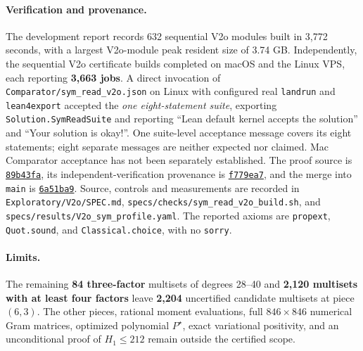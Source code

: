 \documentclass[11pt]{article}
\newcommand{\code}[1]{\texttt{#1}}
\begin{document}
\paragraph{Verification and provenance.}
The development report records 632 sequential V2o modules built in 3,772
seconds, with a largest V2o-module peak resident size of 3.74 GB.
Independently, the sequential V2o certificate builds completed on macOS
and the Linux VPS, each reporting \textbf{3,663 jobs}. A direct invocation
of \nolinkurl{Comparator/sym_read_v2o.json} on Linux with configured real
\code{landrun} and \code{lean4export} accepted the \emph{one eight-statement
suite}, exporting \code{Solution.SymReadSuite} and reporting
``Lean default kernel accepts the solution'' and ``Your solution is okay!''.
One suite-level acceptance message covers its eight statements; eight
separate messages are neither expected nor claimed. Mac Comparator
acceptance has not been separately established. The proof source is
\href{https://github.com/thinkthoughts/lean-bgp212/commit/89b43fa}{\code{89b43fa}},
its independent-verification provenance is
\href{https://github.com/thinkthoughts/lean-bgp212/commit/f779ea7}{\code{f779ea7}},
and the merge into \code{main} is
\href{https://github.com/thinkthoughts/lean-bgp212/commit/6a51ba9}{\code{6a51ba9}}.
Source, controls and measurements are recorded in
\nolinkurl{Exploratory/V2o/SPEC.md},
\nolinkurl{specs/checks/sym_read_v2o_build.sh}, and
\nolinkurl{specs/results/V2o_sym_profile.yaml}. The reported axioms are
\code{propext}, \code{Quot.sound}, and \code{Classical.choice}, with no
\code{sorry}.

\paragraph{Limits.}
The remaining \textbf{84 three-factor} multisets of degrees 28--40 and
\textbf{2,120 multisets with at least four factors} leave \textbf{2,204}
uncertified candidate multisets at piece $(6,3)$. The other pieces,
rational moment evaluations, full $846\times846$ numerical Gram matrices,
optimized polynomial $P^\star$, exact variational positivity, and an
unconditional proof of $H_1\le212$ remain outside the certified scope.
\end{document}
